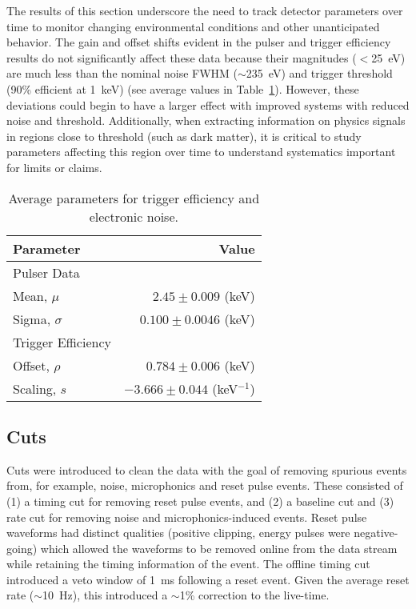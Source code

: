 	The results of this section underscore the need to track detector parameters over time to monitor changing environmental conditions and other unanticipated behavior.  The gain and offset shifts evident in the pulser and trigger efficiency results do not significantly affect these data because their magnitudes ($<$25~eV) are much less than the nominal noise FWHM ($\sim$235~eV) and trigger threshold (90\% efficient at 1~keV) (see average values in Table~\ref{tab:PPC2AvgPars}).  However, these deviations could begin to have a larger effect with improved systems with reduced noise and threshold.  Additionally, when extracting information on physics signals in regions close to threshold (such as dark matter), it is critical to study parameters affecting this region over time to understand systematics important for limits or claims.  
	
				\begin{table}
					\centering
					\begin{tabular}{l|r}
						Parameter & Value \\
						\hline
						    Pulser Data 	  \\
						    Mean, $\mu$ &  $2.45\pm0.009$ (keV) \\
						    Sigma, $\sigma$ &  $0.100\pm0.0046$ (keV) \\						    
						    Trigger Efficiency 	  \\
						    Offset, $\rho$ &  $0.784\pm0.006$ (keV) \\
						    Scaling, $s$ &  $-3.666\pm0.044$ (keV$^{-1}$) \\						    						    
						\hline
					\end{tabular}
					\caption{Average parameters for trigger efficiency and electronic noise.}
					\label{tab:PPC2AvgPars}
				\end{table}	
	    	\subsection{Cuts}
		\label{sec:DeploymentPPC2SoudanAnalysisCuts}    
			
	Cuts were introduced to clean the data with the goal of removing spurious events from, for example, noise, microphonics and reset pulse events.  These consisted of (1) a timing cut for removing reset pulse events, and (2) a baseline cut and (3) rate cut for removing noise and microphonics-induced events.  Reset pulse waveforms had distinct qualities (positive clipping, energy pulses were negative-going) which allowed the waveforms to be removed online from the data stream while retaining the timing information of the event.  The offline timing cut introduced a veto window of 1~ms following a reset event.  Given the average reset rate ($\sim$10~Hz), this introduced a $\sim$1\% correction to the live-time.  
	
